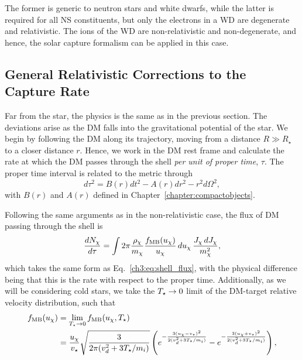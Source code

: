 The former is generic to neutron stars and white dwarfs, while the latter is required for all NS constituents, but only the electrons in a WD are degenerate and relativistic. The ions of the WD are non-relativistic and non-degenerate, and hence, the solar capture formalism can be applied in this case. 

\subsection{General Relativistic Corrections to the Capture Rate}
\label{ch3:subsec:GR_corr_capture}

Far from the star, the physics is the same as in the previous section. The deviations arise as the DM falls into the gravitational potential of the star. We begin by following the DM along its trajectory, moving from a distance $R\gg R_\star$ to a closer distance $r$. Hence, we work in the DM rest frame and calculate the rate at which the DM passes through the shell \textit{per unit of proper time}, $\tau$. The proper time interval is related to the metric through
\begin{equation}
    d\tau^2 = B(r) dt^2 - A(r) dr^2 - r^2 d\Omega^2,
\end{equation}
with $B(r)$ and $A(r)$ defined in Chapter~\ref{chapter:compactobjects}. 

Following the same arguments as in the non-relativistic case, the flux of DM passing through the shell is 
\begin{equation}
    \frac{d N_\chi}{d\tau} = \int 2\pi \frac{\rho_\chi}{m_\chi}\frac{f_{\rm MB}(u_\chi)}{u_\chi}\,du_\chi\,\frac{J_\chi \, dJ_\chi}{m_\chi^2},
\end{equation}
which takes the same form as Eq.~\ref{ch3:eq:shell_flux}, with the physical difference being that this is the rate with respect to the proper time. Additionally, as we will be considering cold stars, we take the $T_\star\rightarrow 0$ limit of the DM-target relative velocity distribution, such that 
\begin{align}
    f_{\mathrm{MB}}(u_\chi) & = \lim_{T_\star\rightarrow 0}f_{\mathrm{MB}}(u_\chi, T_\star)\\
    & = \frac{u_\chi}{v_\star} \sqrt{\frac{3 }{2 \pi (v_d^2 + 3 T_\star /m_i)}} \left( e^{-\frac{3(u_\chi - v_\star)^2}{2(v_d^2 + 3 T_\star /m_i)}} - e^{-\frac{3(u_\chi + v_\star)^2}{2(v_d^2 + 3 T_\star /m_i)}} \right),
    \label{ch3:eq:MB}
\end{align}

